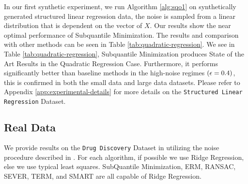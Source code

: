 \documentclass{article} %
\begin{document}
	In our first synthetic experiment, we run Algorithm \ref{alg:sqo1} on synthetically generated structured linear regression data, the noise is sampled from a linear distribution that is dependent on the vector of $X$. Our results show the near optimal performance of Subquantile Minimization. The results and comparison with other methods can be seen in Table \ref{tab:quadratic-regression}. We see in Table \ref{tab:quadratic-regression}, Subquantile Minimization produces State of the Art Results in the Quadratic Regression Case. Furthermore, it performs significantly better than baseline methods in the high-noise regimes $({\epsilon} = 0.4)$, this is confirmed in both the small data and large data datasets. Please refer to Appendix \ref{app:experimental-details} for more details on the \texttt{Structured Linear Regression} Dataset. 

	\subsection{Real Data}
	
	We provide results on the \texttt{Drug Discovery} Dataset in \cite{DiakonikolasKKLSS19} utilizing the noise procedure described in \cite{li2020tilted}. For each algorithm, if possible we use Ridge Regression, else we use typical least squares. SubQuantile Minimization, ERM, RANSAC, SEVER, TERM, and SMART are all capable of Ridge Regression. 
	
\end{document}
